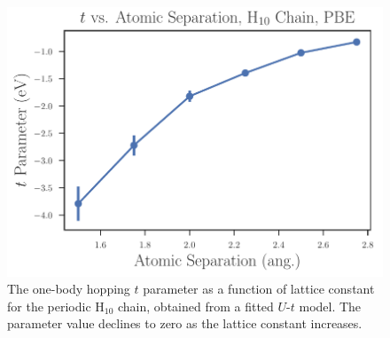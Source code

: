  \begin{figure}
\centering
\includegraphics[scale=0.6]{./Figures/$t$_vs_separation_h_chain_ols.pdf}
\caption{The one-body hopping $t$ parameter as a function of lattice constant for the periodic H$_{10}$ chain, obtained from a fitted $U$-$t$ model. The parameter value declines to zero as the lattice constant increases. }\label{fig:Parameters-vs-Bond-t}
 \end{figure}
